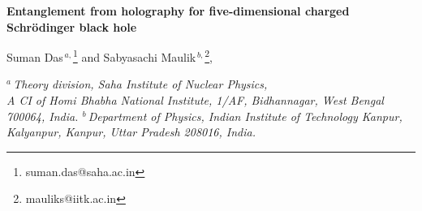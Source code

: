 \documentclass[12pt,a4paper]{article}
\numberwithin{equation}{section}
\begin{document}
	\renewcommand{\thefootnote}{\arabic{footnote}}
	
	
	
	\overfullrule=0pt
	\parskip=2pt
	\parindent=12pt
	\headheight=0in \headsep=0in \topmargin=0in \oddsidemargin=0in
	
	
	
	
	\vspace{ -3cm} \thispagestyle{empty} \vspace{-1cm}
	\begin{flushright} 
		\footnotesize
		\textcolor{red}{\phantom{print-report}}
	\end{flushright}
	
	



\begin{center}
	\vspace{1.2cm}
	{\Large\bf {}
	Entanglement from holography for five-dimensional charged Schr\"{o}dinger black hole}
	\\
	\vspace{.2cm}
	\noindent
	{\Large\bf {}}
	
	
	
	\vspace{0.4cm} {
		Suman Das$^{\,a,}$\footnote[1]{suman.das@saha.ac.in} and Sabyasachi Maulik$^{\,b,}$\footnote[2]{mauliks@iitk.ac.in}},
	\vskip  0.4cm
	
	\small
	{\em
		$^{a}\,$Theory division, Saha Institute of Nuclear Physics,\\ A CI of Homi Bhabha National Institute, 1/AF, Bidhannagar, West Bengal 700064, India.
		\vskip 0.1cm
		$^{b}\,$Department of Physics, Indian Institute of Technology Kanpur,\\ Kalyanpur, Kanpur, Uttar Pradesh 208016, India.
	}
	\normalsize
	
\end{center}

\vspace{0.1cm}
\begin{abstract} 
We study entanglement entropy in a non-relativistic Schr\"{o}dinger field theory at finite temperature and electric charge using the principle of gauge/gravity duality. The spacetime geometry is obtained from a charged AdS black hole by a null Melvin twist. By using an appropriate modification of the holographic Ryu-Takayanagi formula, we calculate the entanglement entropy, mutual information, and entanglement wedge cross-section for the simplest strip subsystem. The entanglement measures show non-trivial dependence on the black hole parameters.
\end{abstract}
\end{document}
